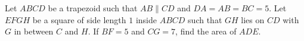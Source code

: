 Let $ABCD$ be a trapezoid such that $AB\parallel CD$ and $DA=AB=BC=5$. Let $EFGH$ be a square of side length $1$ inside $ABCD$ such that $GH$ lies on $CD$ with $G$ in between $C$ and $H$. If $BF=5$ and $CG=7$, find the area of $ADE$.
